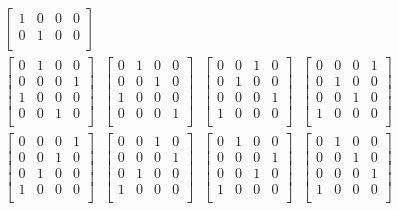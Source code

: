 \documentclass[]{article}
\begin{document}
\begin{equation}
\begin{aligned}
\begin{bmatrix}
1 &0 &0 &0\\
0 &1 &0 &0\\
 \end{bmatrix}\;\;\\\begin{bmatrix}
0 &1 &0 &0\\
0 &0 &0 &1\\
1 &0 &0 &0\\
0 &0 &1 &0\\
 \end{bmatrix}\;\;\begin{bmatrix}
0 &1 &0 &0\\
0 &0 &1 &0\\
1 &0 &0 &0\\
0 &0 &0 &1\\
 \end{bmatrix}\;\;\begin{bmatrix}
0 &0 &1 &0\\
0 &1 &0 &0\\
0 &0 &0 &1\\
1 &0 &0 &0\\
 \end{bmatrix}\;\;\begin{bmatrix}
0 &0 &0 &1\\
0 &1 &0 &0\\
0 &0 &1 &0\\
1 &0 &0 &0\\
 \end{bmatrix}\;\;\\\begin{bmatrix}
0 &0 &0 &1\\
0 &0 &1 &0\\
0 &1 &0 &0\\
1 &0 &0 &0\\
 \end{bmatrix}\;\;\begin{bmatrix}
0 &0 &1 &0\\
0 &0 &0 &1\\
0 &1 &0 &0\\
1 &0 &0 &0\\
 \end{bmatrix}\;\;\begin{bmatrix}
0 &1 &0 &0\\
0 &0 &0 &1\\
0 &0 &1 &0\\
1 &0 &0 &0\\
 \end{bmatrix}\;\;\begin{bmatrix}
0 &1 &0 &0\\
0 &0 &1 &0\\
0 &0 &0 &1\\
1 &0 &0 &0\\
 \end{bmatrix}\;\;\\\end{aligned}
\end{equation}
\end{document}
